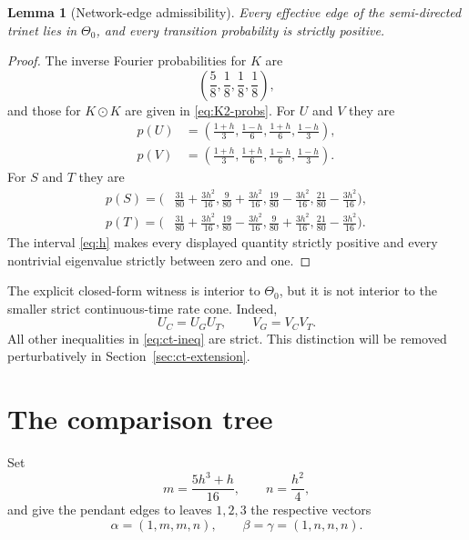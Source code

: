 \documentclass[11pt]{article}
\newtheorem{lemma}[theorem]{Lemma}
\theoremstyle{remark}
\newcommand{\ThetaZero}{\Theta_{0}}
\newcommand{\odotv}{\mathbin{\odot}}
\begin{document}
\begin{lemma}[Network-edge admissibility]\label{lem:network-adm}
Every effective edge of the semi-directed trinet lies in $\ThetaZero$, and every transition probability is strictly positive.
\end{lemma}

\begin{proof}
The inverse Fourier probabilities for $K$ are
\[
  \left(\frac58,\frac18,\frac18,\frac18\right),
\]
and those for $K\odotv K$ are given in \eqref{eq:K2-probs}.  For $U$ and $V$ they are
\begin{align*}
 p(U)&=\left(\frac{1+h}{3},\frac{1-h}{6},
             \frac{1+h}{6},\frac{1-h}{3}\right),\\
 p(V)&=\left(\frac{1+h}{3},\frac{1+h}{6},
             \frac{1-h}{6},\frac{1-h}{3}\right).
\end{align*}
For $S$ and $T$ they are
\begin{align*}
 p(S)=\bigg(&\frac{31}{80}+\frac{3h^2}{16},
              \frac9{80}+\frac{3h^2}{16},
              \frac{19}{80}-\frac{3h^2}{16},
              \frac{21}{80}-\frac{3h^2}{16}\bigg),\\
 p(T)=\bigg(&\frac{31}{80}+\frac{3h^2}{16},
              \frac{19}{80}-\frac{3h^2}{16},
              \frac9{80}+\frac{3h^2}{16},
              \frac{21}{80}-\frac{3h^2}{16}\bigg).
\end{align*}
The interval \eqref{eq:h} makes every displayed quantity strictly positive and every nontrivial eigenvalue strictly between zero and one.
\end{proof}

The explicit closed-form witness is interior to $\ThetaZero$, but it is not interior to the smaller strict continuous-time rate cone.  Indeed,
\begin{equation}\label{eq:ct-boundary}
  U_C=U_GU_T,
  \qquad
  V_G=V_CV_T.
\end{equation}
All other inequalities in \eqref{eq:ct-ineq} are strict.  This distinction will be removed perturbatively in Section~\ref{sec:ct-extension}.

\section{The comparison tree}

Set
\begin{equation}\label{eq:mn}
  m=\frac{5h^3+h}{16},
  \qquad n=\frac{h^2}{4},
\end{equation}
and give the pendant edges to leaves $1,2,3$ the respective vectors
\begin{equation}\label{eq:tree-vectors}
  \alpha=(1,m,m,n),
  \qquad
  \beta=\gamma=(1,n,n,n).
\end{equation}
\end{document}
